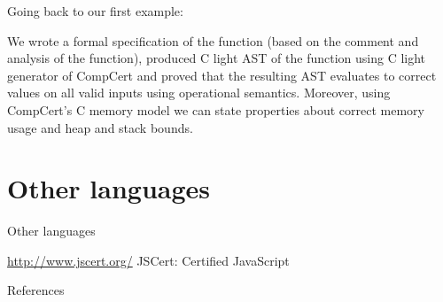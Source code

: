\documentclass[10pt]{beamer}
\begin{document}
    \begin{frame}
      Going back to our first example:
      
       We wrote a formal specification of the function (based on the comment and analysis of the function), produced C light AST of the function using C light generator of CompCert and proved that the resulting AST evaluates to correct values on all valid inputs using operational semantics. Moreover, using CompCert's C memory model we can state properties about correct memory usage and heap and stack bounds.
      \end{frame}

\section{Other languages}

\begin{frame}{Other languages}

  \url{http://www.jscert.org/} JSCert: Certified JavaScript
  
  \end{frame}

\begin{frame}[allowframebreaks]{References}

  
  

\end{frame}
\end{document}
